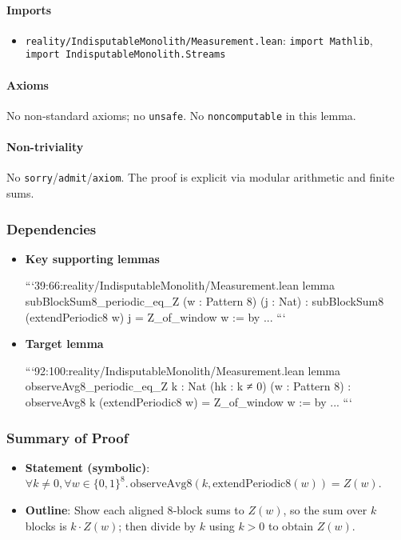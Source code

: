 \documentclass{article}
\newcommand{\FileRef}[1]{\texttt{#1}}
\begin{document}
\paragraph{Imports}
\begin{itemize}[leftmargin=*]
  \item \FileRef{reality/IndisputableMonolith/Measurement.lean}: \texttt{import Mathlib}, \texttt{import IndisputableMonolith.Streams}
\end{itemize}

\paragraph{Axioms}
No non‑standard axioms; no \texttt{unsafe}. No \texttt{noncomputable} in this lemma.

\paragraph{Non-triviality}
No \texttt{sorry}/\texttt{admit}/\texttt{axiom}. The proof is explicit via modular arithmetic and finite sums.

\subsubsection{Dependencies}
\begin{itemize}[leftmargin=*]
  \item \textbf{Key supporting lemmas}

```39:66:reality/IndisputableMonolith/Measurement.lean
lemma subBlockSum8_periodic_eq_Z (w : Pattern 8) (j : Nat) :
  subBlockSum8 (extendPeriodic8 w) j = Z_of_window w := by
  ...
```

  \item \textbf{Target lemma}

```92:100:reality/IndisputableMonolith/Measurement.lean
lemma observeAvg8_periodic_eq_Z {k : Nat} (hk : k ≠ 0) (w : Pattern 8) :
  observeAvg8 k (extendPeriodic8 w) = Z_of_window w := by
  ...
```
\end{itemize}

\subsubsection{Summary of Proof}
\begin{itemize}[leftmargin=*]
  \item \textbf{Statement (symbolic)}: \(\forall k\neq 0,\forall w\in\{0,1\}^8.\, \mathrm{observeAvg8}(k,\mathrm{extendPeriodic8}(w)) = Z(w)\).
  \item \textbf{Outline}: Show each aligned 8‑block sums to \(Z(w)\), so the sum over \(k\) blocks is \(k\cdot Z(w)\); then divide by \(k\) using \(k>0\) to obtain \(Z(w)\).
\end{itemize}
\end{document}
